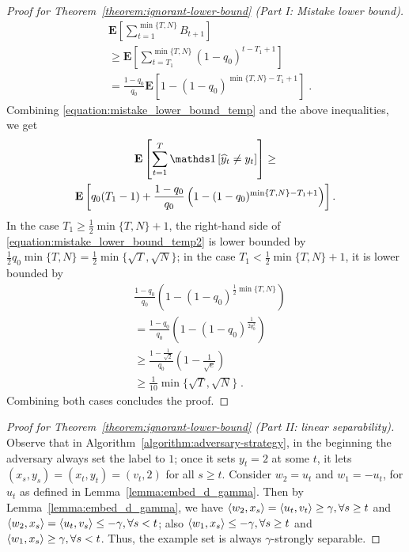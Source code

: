 \begin{proof}[Proof for Theorem~\ref{theorem:ignorant-lower-bound} (Part I: Mistake lower bound)]
\begin{align*}
& \mathbf{E}\left[\sum_{t=1}^{\min\{T,N\}}B_{t+1}\right] \\
& \ge \mathbf{E}\left[\sum_{t=T_1}^{\min\{ T,N \}} (1-q_0)^{t-T_1+1} \right] \\
& = \frac{1-q_0}{q_0}\mathbf{E}\left[1-(1-q_0)^{\min\{T,N\}-T_1+1}\right] \; .
\end{align*}
Combining \eqref{equation:mistake_lower_bound_temp} and the above inequalities, we get
\begin{multline}
\label{equation:mistake_lower_bound_temp2}
\mathbf{E} \left[\sum_{t=1}^T \indicator{\widehat y_t\neq y_t}\right] \ge
\\ \mathbf{E}\left[q_0(T_1-1)+\frac{1-q_0}{q_0}\left(1-(1-q_0)^{\min\{T,N\}-T_1+1}\right)\right].
\end{multline}
In the case $T_1\ge \frac{1}{2}\min\{T,N\}+1$, the right-hand side of
\eqref{equation:mistake_lower_bound_temp2} is lower bounded by
$\frac{1}{2}q_0\min\{T,N\}=\frac{1}{2}\min\{\sqrt{T}, \sqrt{N}\}$; in the case
$T_1< \frac{1}{2}\min\{T,N\}+1$, it is lower bounded by
\begin{align*}
& \frac{1-q_0}{q_0}\left(1-(1-q_0)^{\frac{1}{2}\min\{T,N\}}\right) \\
& = \frac{1-q_0}{q_0}\left(1-(1-q_0)^{\frac{1}{2q_0^2}}\right) \\
& \ge \frac{1-\frac{1}{\sqrt{2}}}{q_0}\left(1-\frac{1}{\sqrt{e}}\right) \\
& \ge \frac{1}{10}\min\{\sqrt{T}, \sqrt{N}\} \; .
\end{align*}
Combining both cases concludes the proof.
\end{proof}

\begin{proof}[Proof for Theorem~\ref{theorem:ignorant-lower-bound} (Part II: linear separability)]
Observe that in Algorithm~\ref{algorithm:adversary-strategy}, in the beginning
the adversary always set the label to $1$; once it sets $y_t=2$ at some $t$, it
lets $(x_s, y_s)=(x_t, y_t)=(v_t, 2)$ for all $s\ge t$. Consider $w_2=u_t$ and
$w_1=-u_t$, for $u_t$ as defined in Lemma~\ref{lemma:embed_d_gamma}. Then by
Lemma~\ref{lemma:embed_d_gamma}, we have $\left\langle w_2, x_s \right\rangle = \left\langle u_t, v_t \right\rangle \ge
\gamma, \forall s \ge t$ and $\left\langle w_2, x_s \right\rangle = \left\langle u_t, v_s \right\rangle \le - \gamma,
\forall s< t$; also $\left\langle w_1, x_s \right\rangle \le -\gamma, \forall s \ge t$ and
$\left\langle w_1, x_s \right\rangle \ge  \gamma, \forall s<t$. Thus, the example set is always
$\gamma$-strongly separable.
\end{proof}
